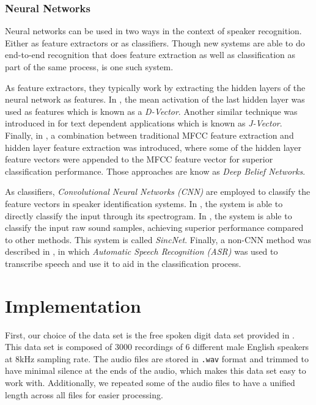\documentclass[twocolumn]{article}
\begin{document}
\subsubsection{Neural Networks}

Neural networks can be used in two ways in the context of speaker recognition.
Either as feature extractors or as classifiers. Though new systems are able to
do end-to-end recognition that does feature extraction as well as
classification as part of the same process, \autocite{Heigold2016} is one such
system.

As feature extractors, they typically work by extracting the hidden layers of
the neural network as features. In \autocite{Variani2014}, the mean activation
of the last hidden layer was used as features which is known as a
\emph{D-Vector}. Another similar technique was introduced in
\autocite{Chen2015} for text dependent applications which is known as
\emph{J-Vector}. Finally, in \autocite{Banerjee2018}, a combination between
traditional MFCC feature extraction and hidden layer feature extraction was
introduced, where some of the hidden layer feature vectors were appended to the
MFCC feature vector for superior classification performance. Those approaches
are know as \emph{Deep Belief Networks}.

As classifiers, \emph{Convolutional Neural Networks (CNN)} are employed to
classify the feature vectors in speaker identification systems.  In
\autocite{Hajavi2019}, the system is able to directly classify the input
through its spectrogram. In \autocite{Ravanelli2018}, the system is able to
classify the input raw sound samples, achieving superior performance compared
to other methods. This system is called \emph{SincNet}. Finally, a non-CNN
method was described in \autocite{Toshniwal2017}, in which \emph{Automatic
Speech Recognition (ASR)} was used to transcribe speech and use it to aid in
the classification process.

\section{Implementation}
\label{sec:Implementation}

First, our choice of the data set is the free spoken digit data set provided in
\autocite{Zohar2018}. This data set is composed of 3000 recordings of 6
different male English speakers at 8kHz sampling rate. The audio files are
stored in \texttt{.wav} format and trimmed to have minimal silence at the ends
of the audio, which makes this data set easy to work with. Additionally, we
repeated some of the audio files to have a unified length across all files for
easier processing.
\end{document}

